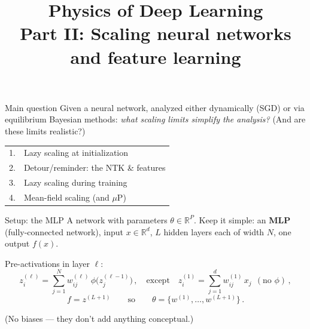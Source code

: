 \documentclass[11pt]{beamer}
\newcommand{\R}{\mathbb{R}}
\newcommand{\hl}[1]{{\color{blue!60!black}\textbf{#1}}}
\begin{document}
\title{Physics of Deep Learning\\[2pt]
\large Part II: Scaling neural networks and feature learning}
\begin{frame}
  \titlepage
  \vspace{-2mm}
  \begin{block}{Main question}
    Given a neural network, analyzed either dynamically (SGD) or via
    equilibrium Bayesian methods: \emph{what scaling limits simplify the
    analysis?} (And are these limits realistic?)
  \end{block}
  \begin{center}\small
  \begin{tabular}{ll}
    1. & Lazy scaling at initialization \\
    2. & Detour/reminder: the NTK \& features \\
    3. & Lazy scaling during training \\
    4. & Mean-field scaling (and $\mu$P)
  \end{tabular}
  \end{center}
\end{frame}

\begin{frame}{Setup: the MLP}
  A network with parameters $\theta\in\R^P$. Keep it simple: an
  \hl{MLP} (fully-connected network), input $x \in \R^d$, $L$ hidden
  layers each of width $N$, one output $f(x)$.
  \vspace{2mm}

  Pre-activations in layer $\ell$:
  \[
    z^{(\ell)}_i = \sum_{j=1}^{N} w^{(\ell)}_{ij}\, \phi\big(z^{(\ell-1)}_j\big)\,,
    \quad\text{except}\quad
    z^{(1)}_i = \sum_{j=1}^{d} w^{(1)}_{ij}\, x_j \ \ (\text{no } \phi)\,,
  \]
  \[
    f = z^{(L+1)} \qquad\text{so}\qquad
    \theta = \{w^{(1)}, \dots, w^{(L+1)}\}\,.
  \]
  \vspace{1mm}

  (No biases --- they don't add anything conceptual.)
\end{frame}
\end{document}
